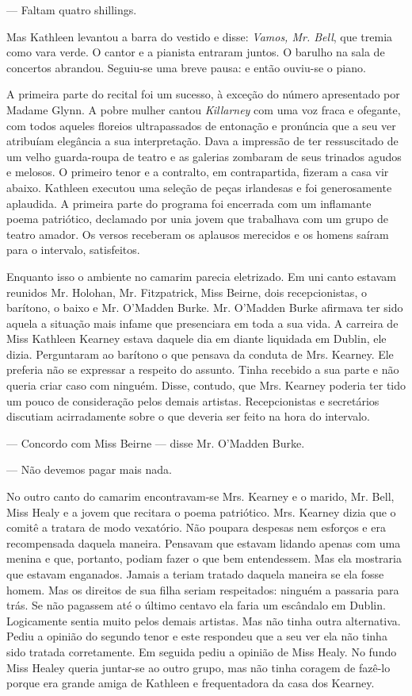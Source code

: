 --- Faltam quatro shillings.

Mas Kathleen levantou a barra do vestido e disse: \textit{Vamos, Mr. Bell},
que tremia como vara verde. O cantor e a pianista entraram juntos. O
barulho na sala de concertos abrandou. Seguiu-se uma breve pausa: e
então ouviu-se o piano.

A primeira parte do recital foi um sucesso, à exceção do número
apresentado por Madame Glynn. A pobre mulher cantou \textit{Killarney} com uma
voz fraca e ofegante, com todos aqueles floreios ultrapassados de
entonação e pronúncia que a seu ver atribuíam elegância a sua
interpretação. Dava a impressão de ter ressuscitado de um velho
guarda-roupa de teatro e as galerias zombaram de seus trinados agudos
e melosos. O primeiro tenor e a contralto, em contrapartida, fizeram a
casa vir abaixo. Kathleen executou uma seleção de peças irlandesas e
foi generosamente aplaudida. A primeira parte do programa foi
encerrada com um inflamante poema patriótico, declamado por unia jovem
que trabalhava com um grupo de teatro amador. Os versos receberam os
aplausos merecidos e os homens saíram para o intervalo, satisfeitos.

Enquanto isso o ambiente no camarim parecia eletrizado. Em uni canto
estavam reunidos Mr. Holohan, Mr. Fitzpatrick, Miss Beirne, dois
recepcionistas, o barítono, o baixo e Mr. O'Madden Burke. Mr. O'Madden
Burke afirmava ter sido aquela a situação mais infame que
presenciara em toda a sua vida. A carreira de Miss Kathleen Kearney
estava daquele dia em diante liquidada em Dublin, ele dizia.
Perguntaram ao barítono o que pensava da
conduta de Mrs. Kearney. Ele preferia não se expressar a respeito do
assunto. Tinha recebido a sua parte e não queria criar caso com
ninguém. Disse, contudo, que Mrs. Kearney poderia ter tido um pouco de
consideração pelos demais artistas. Recepcionistas e secretários
discutiam acirradamente sobre o que deveria ser feito na hora do
intervalo.

--- Concordo com Miss Beirne --- disse Mr. O'Madden Burke.

--- Não devemos pagar mais nada.

No outro canto do camarim encontravam-se Mrs. Kearney e o marido, Mr.
Bell, Miss Healy e a jovem que recitara o poema patriótico. Mrs.
Kearney dizia que o comitê a tratara de modo vexatório. Não poupara
despesas nem esforços e era recompensada daquela maneira. Pensavam
que estavam lidando apenas com uma menina e que, portanto, podiam
fazer o que bem entendessem. Mas ela mostraria que estavam
enganados. Jamais a teriam tratado daquela maneira se ela fosse homem.
Mas os direitos de sua filha seriam respeitados: ninguém a passaria
para trás. Se não pagassem até o último centavo ela faria um escândalo
em Dublin. Logicamente sentia muito pelos demais artistas. Mas não
tinha outra alternativa. Pediu a opinião do segundo tenor e este
respondeu que a seu ver ela não tinha sido tratada corretamente. Em
seguida pediu a opinião de Miss Healy. No fundo Miss Healey queria
juntar-se ao outro grupo, mas não tinha coragem de fazê-lo porque era
grande amiga de Kathleen e frequentadora da casa dos Kearney.

